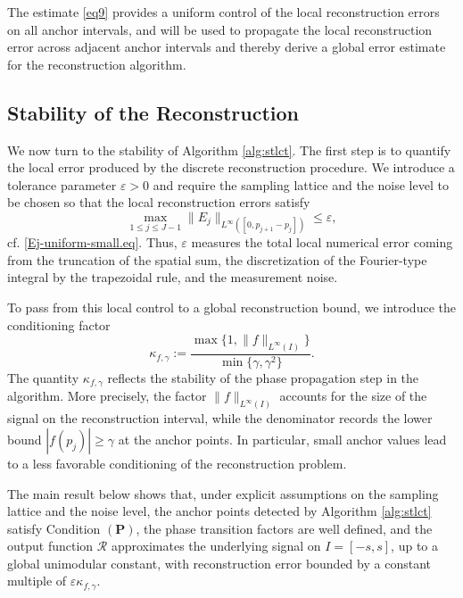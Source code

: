 \documentclass[11pt, reqno]{amsart}
\numberwithin{equation}{section}
\begin{document}
The estimate \eqref{eq9} provides a uniform control of the local reconstruction errors on all anchor intervals, and will be used  to  propagate the local reconstruction error across adjacent anchor intervals and thereby derive a global error estimate for the reconstruction algorithm.


\subsection{Stability of the Reconstruction} 
We now turn to the stability of Algorithm \ref{alg:stlct}. The first step is to quantify the local error produced by the discrete reconstruction procedure. We introduce a tolerance parameter $\varepsilon>0$ and require the sampling lattice and the noise level to be chosen so that the local reconstruction errors satisfy
$$ \max_{1\le j\le J-1}\|E_j\|_{L^\infty([0,p_{j+1}-p_j])}\le \varepsilon,$$
cf. \eqref{Ej-uniform-small.eq}. Thus, $\varepsilon$ measures the total local numerical error coming from the truncation of the spatial sum, the discretization of the Fourier-type integral by the trapezoidal rule, and the measurement noise. 

To pass from this local control to a global reconstruction bound, we introduce the conditioning factor
\begin{equation}\label{kappa-def.eq}
\kappa_{f,\gamma} := \frac{\max\{1,\|f\|_{L^\infty(I)}\}}{\min\{\gamma,\gamma^2\}}.
\end{equation}
The quantity $\kappa_{f,\gamma}$ reflects the stability of the phase propagation step in the algorithm. More precisely, the factor $\|f\|_{L^\infty(I)}$ accounts for the size of the signal on the reconstruction interval, while the denominator records the lower bound $|f(p_j)|\ge \gamma$ at the anchor points. In particular, small anchor values lead to a less favorable conditioning of the reconstruction problem.

The main result below shows that, under explicit assumptions on the sampling lattice and the noise level, the anchor points detected by Algorithm \ref{alg:stlct} satisfy Condition $(\mathbf P)$, the phase transition factors are well defined, and the output function $\mathcal R$ approximates the underlying signal on $I=[-s,s]$,  up to a global unimodular constant, with reconstruction error bounded by a constant multiple of $\varepsilon\kappa_{f,\gamma}$.
\end{document}
